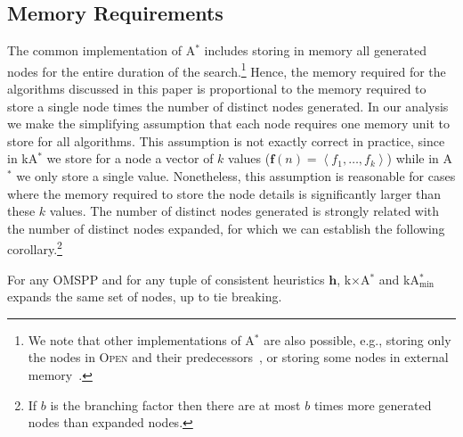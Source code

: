 \documentclass[smallextended]{svjour3}       %
\newcommand{\omspp}{\ac{OMSPP}\xspace}
\newcommand{\astar}{A$^*$\xspace}
\newcommand{\kastar}{kA$^*$\xspace}
\newcommand{\kastarvar}[1]{\textup{kA}$^*_{#1}$\xspace}
\newcommand{\kastarmin}{\kastarvar{\min}}
\newcommand{\kxastar}{k$\times$A$^*$\xspace}
\newcommand{\astari}[1]{A$^*_{#1}$\xspace}
\newcommand{\tuple}[1]{\ensuremath{\left \langle #1 \right \rangle }}
\newcommand{\open}{\textsc{Open}\xspace}
\newcommand{\vect}[1]{\mathbf{#1}}
\begin{document}
\subsection{Memory Requirements}

The common implementation of \astar 
includes storing  in memory  all generated nodes for the entire duration of the search.\footnote{We note that other implementations of \astar are also possible, e.g., storing only the nodes in \open and their predecessors~\cite{zhou2006breadth,korf2004best}, or storing some nodes in external memory~\cite{zhou2004structured,edelkamp2016external,edelkamp2005external}.}
Hence, the memory required for the algorithms discussed in this paper is proportional to 
the memory required to store a single node times the number of distinct nodes generated. 
In our analysis we make the simplifying assumption that each node requires one memory unit to store for all algorithms. This assumption is not exactly correct in practice, since in \kastar we store for a node a vector of $k$ values ($\vect{f}(n)=\tuple{f_1,\ldots,f_k}$) while in \astar we only store a single value.
Nonetheless, this assumption is reasonable for cases where the memory required to store the node details is significantly larger than these $k$ values. %
The number of distinct nodes generated is strongly related with the number of distinct nodes expanded, for which we can establish the following corollary.\footnote{If $b$ is the branching factor then there are at most $b$ times more generated nodes than expanded nodes.} 
\begin{corollary}
	For any \omspp and for any tuple of consistent heuristics $\vect{h}$, \kxastar and \kastarmin expands the same set of nodes, up to tie breaking.
	\label{cor:expanded}
\end{corollary}
\end{document}
